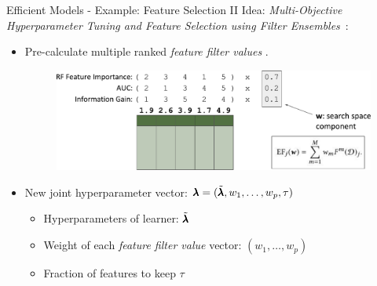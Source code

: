 \begin{frame}{Efficient Models - Example: Feature Selection II}
Idea: \emph{Multi-Objective Hyperparameter Tuning and Feature Selection using Filter Ensembles}~:


  \begin{itemize}
    \item Pre-calculate multiple ranked \emph{feature filter values} .

    \begin{figure}
      \centering
      \includegraphics[width = 0.7\linewidth]{images/mosmafs_presentation_p39.pdf}
    \end{figure}

    \item New joint hyperparameter vector: $\pmb{\lambda} = (\tilde{\pmb{\lambda}}, w_1, \ldots, w_p ,\tau )$
    \begin{itemize}
      \item Hyperparameters of learner: $\tilde{\pmb{\lambda}}$
      \item Weight of each \emph{feature filter value} vector: $(w_1, \ldots, w_p)$
      \item Fraction of features to keep $\tau$
    \end{itemize}

  \end{itemize}

\end{frame}

